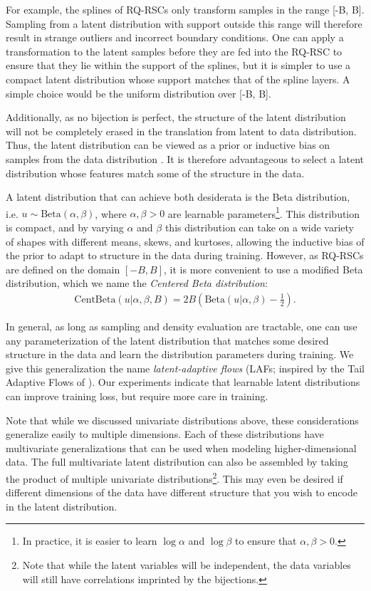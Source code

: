 \documentclass[twocolumn,twocolappendix,linenumbers]{aastex631}
\begin{document}
For example, the splines of RQ-RSCs only transform samples in the range [-B, B].
Sampling from a latent distribution with support outside this range will therefore result in strange outliers and incorrect boundary conditions.
One can apply a transformation to the latent samples before they are fed into the RQ-RSC to ensure that they lie within the support of the splines, but it is simpler to use a compact latent distribution whose support matches that of the spline layers.
A simple choice would be the uniform distribution over [-B, B].

Additionally, as no bijection is perfect, the structure of the latent distribution will not be completely erased in the translation from latent to data distribution.
Thus, the latent distribution can be viewed as a prior or inductive bias on samples from the data distribution \citep{jaini2020}.
It is therefore advantageous to select a latent distribution whose features match some of the structure in the data.

A latent distribution that can achieve both desiderata is the Beta distribution, i.e. $u \sim \mathrm{Beta}(\alpha, \beta)$, where $\alpha, \beta > 0$ are learnable parameters\footnote{In practice, it is easier to learn $\log\alpha$ and $\log\beta$ to ensure that $\alpha, \beta > 0$.}.
This distribution is compact, and by varying $\alpha$ and $\beta$ this distribution can take on a wide variety of shapes with different means, skews, and kurtoses, allowing the inductive bias of the prior to adapt to structure in the data during training.
However, as RQ-RSCs are defined on the domain $[-B, B]$, it is more convenient to use a modified Beta distribution, which we name the \emph{Centered Beta distribution}:
\begin{align}
    \text{CentBeta}(u | \alpha, \beta, B) = 2B\left(\text{Beta}(u|\alpha, \beta) - \frac{1}{2}\right).
\end{align}

In general, as long as sampling and density evaluation are tractable, one can use any parameterization of the latent distribution that matches some desired structure in the data and learn the distribution parameters during training.
We give this generalization the name \emph{latent-adaptive flows} (LAFs; inspired by the Tail Adaptive Flows of \citealt{jaini2020}).
Our experiments indicate that learnable latent distributions can improve training loss, but require more care in training.

Note that while we discussed univariate distributions above, these considerations generalize easily to multiple dimensions.
Each of these distributions have multivariate generalizations that can be used when modeling higher-dimensional data.
The full multivariate latent distribution can also be assembled by taking the product of multiple univariate distributions\footnote{Note that while the latent variables will be independent, the data variables will still have correlations imprinted by the bijections.}.
This may even be desired if different dimensions of the data have different structure that you wish to encode in the latent distribution.
\end{document}

